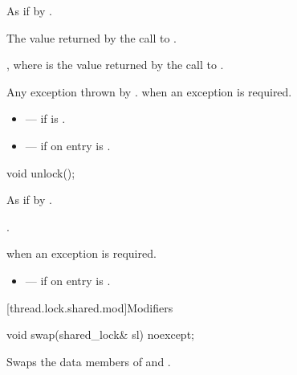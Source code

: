 \begin{itemdescr}
\pnum
\effects
As if by .

\pnum
\returns
The value returned by the call to .

\pnum
\ensures
{}, where  is the value returned by the call to .

\pnum
\throws
Any exception thrown by .  when an exception is required.

\pnum
\errors
\begin{itemize}
\item {} --- if  is .
\item {} --- if on entry  is
.
\end{itemize}
\end{itemdescr}

%
\begin{itemdecl}
void unlock();
\end{itemdecl}

\begin{itemdescr}
\pnum
\effects
As if by .

\pnum
\ensures
{}.

\pnum
\throws
{} when an exception is required.

\pnum
\errors
\begin{itemize}
\item {} --- if on entry  is
.
\end{itemize}
\end{itemdescr}

[thread.lock.shared.mod]{Modifiers}

%
\begin{itemdecl}
void swap(shared_lock& sl) noexcept;
\end{itemdecl}

\begin{itemdescr}
\pnum
\effects
Swaps the data members of  and .
\end{itemdescr}

